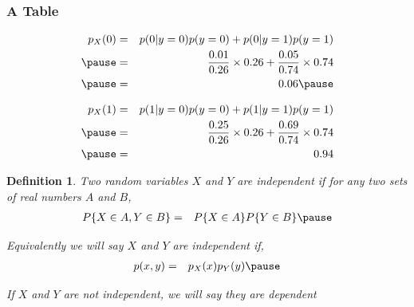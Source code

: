 \documentclass[handout]{beamer}
\newtheorem{defn}{Definition}
\numberwithin{equation}{section}
\begin{document}
\begin{frame}
\frametitle{A Table} 




\begin{eqnarray}
p_{X}(0) & = & p(0|y = 0) p(y= 0) + p(0|y=1) p(y=1) \nonumber \\ \pause
& = & \frac{0.01}{0.26} \times 0.26 + \frac{0.05}{0.74} \times 0.74 \nonumber \\\pause
& = & 0.06 \nonumber \pause
\end{eqnarray}

\begin{eqnarray}
p_{X}(1) & = & p(1|y = 0) p(y= 0) + p(1|y=1) p(y=1) \nonumber \\\pause
& = & \frac{0.25}{0.26} \times 0.26 + \frac{0.69}{0.74} \times 0.74 \nonumber \\\pause
& = & 0.94\nonumber 
\end{eqnarray}



\end{frame}


\begin{frame}

\begin{defn} 
Two random variables $X$ and $Y$ are independent if for any two sets of real numbers $A$ and $B$, \pause 
\begin{eqnarray}
P\{ X \in A , Y \in B \} & = & P\{X \in A\} P\{Y \in B\} \nonumber \pause  
\end{eqnarray}

Equivalently we will say $X$ and $Y$ are independent if,  \pause 
\begin{eqnarray}
p(x,y) & = & p_{X}(x) p_{Y}(y) \nonumber  \pause 
\end{eqnarray}

If $X$ and $Y$ are not independent, we will say they are \alert{dependent} 

\end{defn}

\end{frame}
\end{document}
